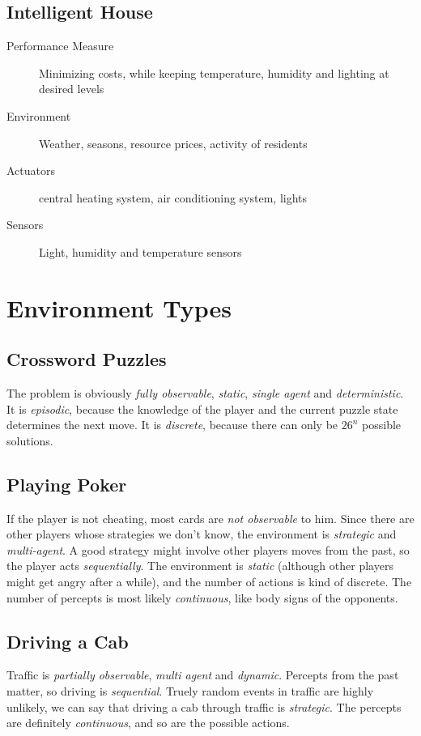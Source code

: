 \documentclass[11pt,a4paper]{scrartcl}
\begin{document}
\subsection{Intelligent House}
\begin{description}
 \item[Performance Measure] Minimizing costs, while keeping temperature, humidity and lighting at desired levels
 \item[Environment] Weather, seasons, resource prices, activity of residents
 \item[Actuators] central heating system, air conditioning system, lights
 \item[Sensors] Light, humidity and temperature sensors
\end{description}


\section{Environment Types}
\subsection{Crossword Puzzles}
The problem is obviously \emph{fully observable}, \emph{static}, \emph{single agent} and \emph{deterministic}. 
It is \emph{episodic}, because the knowledge of the player and the current puzzle state determines the next move. It is \emph{discrete}, because there can only be $26^n$ possible solutions. 

\subsection{Playing Poker}
If the player is not cheating, most cards are \emph{not observable} to him. Since there are other players whose strategies we don't know, the environment is \emph{strategic} and \emph{multi-agent}. 
A good strategy might involve other players moves from the past, so the player acts \emph{sequentially}. The environment is \emph{static} (although other players might get angry after a while), 
and the number of actions is kind of discrete. The number of percepts is most likely \emph{continuous}, like body signs of the opponents. 

\subsection{Driving a Cab}
Traffic is \emph{partially observable}, \emph{multi agent} and \emph{dynamic}. Percepts from the past matter, so driving is \emph{sequential}. Truely random events in traffic are highly unlikely, 
we can say that driving a cab through traffic is \emph{strategic}. The percepts are definitely \emph{continuous}, and so are the possible actions. 
\end{document}
